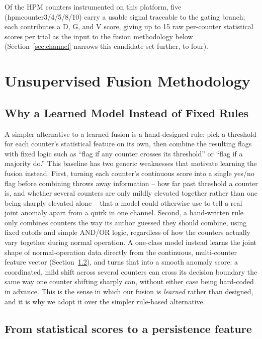 \documentclass[conference]{IEEEtran}
\begin{document}
Of the HPM counters instrumented on this platform, five (hpmcounter3/4/5/8/10) carry a usable signal traceable to the gating branch; each contributes a D, G, and V score, giving up to 15 raw per-counter statistical scores per trial as the input to the fusion methodology below (Section~\ref{sec:channel} narrows this candidate set further, to four).

\section{Unsupervised Fusion Methodology}
\label{sec:methodology}

\subsection{Why a Learned Model Instead of Fixed Rules}
\label{sec:why-ml}

A simpler alternative to a learned fusion is a hand-designed rule: pick a threshold for each counter's statistical feature on its own, then combine the resulting flags with fixed logic such as ``flag if any counter crosses its threshold'' or ``flag if a majority do.'' This baseline has two generic weaknesses that motivate learning the fusion instead. First, turning each counter's continuous score into a single yes/no flag before combining throws away information -- how far past threshold a counter is, and whether several counters are only mildly elevated together rather than one being sharply elevated alone -- that a model could otherwise use to tell a real joint anomaly apart from a quirk in one channel. Second, a hand-written rule only combines counters the way its author guessed they should combine, using fixed cutoffs and simple AND/OR logic, regardless of how the counters actually vary together during normal operation. A one-class model instead learns the joint shape of normal-operation data directly from the continuous, multi-counter feature vector (Section~\ref{sec:persistence}), and turns that into a smooth anomaly score: a coordinated, mild shift across several counters can cross its decision boundary the same way one counter shifting sharply can, without either case being hard-coded in advance. This is the sense in which our fusion is \emph{learned} rather than designed, and it is why we adopt it over the simpler rule-based alternative.

\subsection{From statistical scores to a persistence feature}
\label{sec:persistence}
\end{document}

